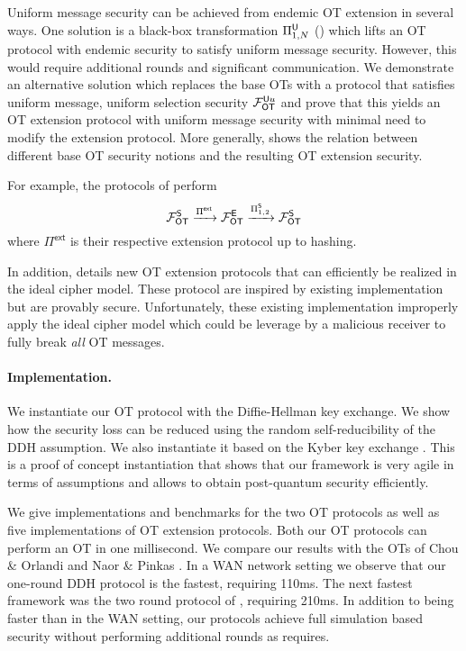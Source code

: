 Uniform message security can be achieved from endemic OT extension in several ways. One solution is a black-box transformation $\Pi^\mathsf{U}_{1,N}$ () which lifts an OT protocol with endemic security to satisfy uniform message security. However, this would require additional rounds and significant communication. We demonstrate an alternative solution which replaces the base OTs with a protocol that satisfies uniform message, uniform selection security $\mathcal{F}_{\mathsf{OT}}^{\mathsf{U} u}$ and prove that this yields an OT extension protocol with uniform message security with minimal need to modify the extension protocol. More generally,  shows the relation between different base OT security notions and the resulting OT extension security. 

\iffullversion
For example, the protocols of \cite{C:IKNP03,EC:ALSZ15,C:KelOrsSch15} perform
$$
\mathcal{F}_{\mathsf{OT}}^\mathsf{S} \xrightarrow{\Pi^{\textsf{ext}}} \mathcal{F}_{\mathsf{OT}}^\mathsf{E} \xrightarrow{\Pi^{\mathsf{S}}_{1,2}} \mathcal{F}_{\mathsf{OT}}^\mathsf{S}
$$
where $\Pi^\textsf{ext}$ is their respective extension protocol up to hashing.
\fi

In addition,  details new OT extension protocols that can efficiently be realized in the ideal cipher model. These protocol are inspired by existing implementation \cite{libOTe,KOS,EMP} but are provably secure. Unfortunately, these existing implementation improperly apply the ideal cipher model which could be leverage by a malicious receiver to fully break \emph{all} OT messages. 


\paragraph{Implementation.} We instantiate our OT protocol with the Diffie-Hellman key exchange. We show how the security loss can be reduced using the random self-reducibility of the DDH assumption. 
We also instantiate it based on the Kyber key exchange \cite{EPRINT:BDKLLS17,NISTPQC-R1:CRYSTALS-KYBER17}. This is a proof of concept instantiation that shows that our framework is very agile in terms of assumptions and allows to obtain post-quantum security efficiently. 

We give implementations and benchmarks for the two OT protocols as well as five implementations of OT extension protocols. Both our OT protocols can perform an OT in one millisecond. We compare our results with the OTs of Chou \& Orlandi \cite{LC:ChoOrl15} and Naor \& Pinkas \cite{SODA:NaoPin01}. In a WAN network setting we observe that our one-round DDH protocol is the fastest, requiring 110ms. The next fastest framework was the two round protocol of \cite{LC:ChoOrl15}, requiring 210ms. In addition to being faster than \cite{LC:ChoOrl15} in the WAN setting, our protocols achieve full simulation based security without performing additional rounds as \cite{LC:ChoOrl15} requires. 

